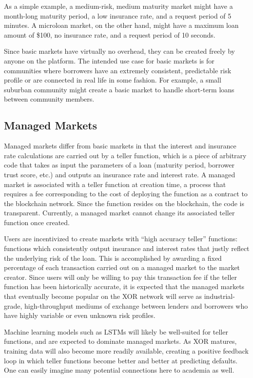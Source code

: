 \documentclass[twoside]{article}
\begin{document}
As a simple example, a medium-risk, medium maturity market might have a month-long maturity period, a low insurance rate, and a request period of 5 minutes. A microloan market, on the other hand, might have a maximum loan amount of \$100, no insurance rate, and a request period of 10 seconds.

Since basic markets have virtually no overhead, they can be created freely by anyone on the platform. The intended use case for basic markets is for communities where borrowers have an extremely consistent, predictable risk profile or are connected in real life in some fashion. For example, a small suburban community might create a basic market to handle short-term loans between community members.
\subsection{Managed Markets}
Managed markets differ from basic markets in that the interest and insurance rate calculations are carried out by a teller function, which is a piece of arbitrary code that takes as input the parameters of a loan (maturity period, borrower trust score, etc.) and outputs an insurance rate and interest rate. A managed market is associated with a teller function at creation time, a process that requires a fee corresponding to the cost of deploying the function as a contract to the blockchain network. Since the function resides on the blockchain, the code is transparent. Currently, a managed market cannot change its associated teller function once created.

Users are incentivized to create markets with “high accuracy teller” functions: functions which consistently output insurance and interest rates that justly reflect the underlying risk of the loan. This is accomplished by awarding a fixed percentage of each transaction carried out on a managed market to the market creator. Since users will only be willing to pay this transaction fee if the teller function has been historically accurate, it is expected that the managed markets that eventually become popular on the XOR network will serve as industrial-grade, high-throughput mediums of exchange between lenders and borrowers who have highly variable or even unknown risk profiles.

Machine learning models such as LSTMs will likely be well-suited for teller functions, and are expected to dominate managed markets. As XOR matures, training data will also become more readily available, creating a positive feedback loop in which teller functions become better and better at predicting defaults. One can easily imagine many potential connections here to academia as well.
\end{document}
